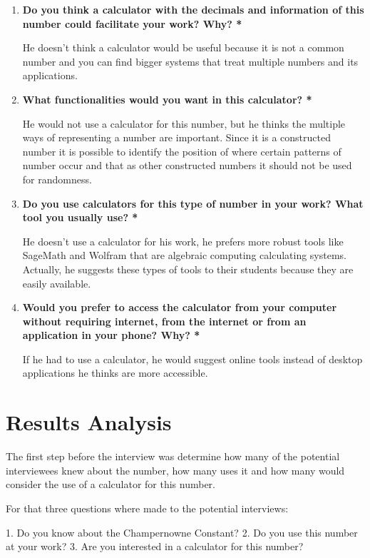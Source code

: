 \documentclass{article}
\begin{document}
\begin{enumerate}
\item\textbf{Do you think a calculator with the decimals and information of this number could facilitate your work? Why?\color{red} *}

He doesn’t think a calculator would be useful because it is not a common number and you can find bigger systems that treat multiple numbers and its applications. 

\item\textbf{What functionalities would you want in this calculator?\color{red} *}

He would not use a calculator for this number, but he thinks the multiple ways of representing a number are important. Since it is a constructed number it is possible to identify the position of where certain patterns of number occur and that as other constructed numbers it should not be used for randomness.

\item\textbf{Do you use calculators for this type of number in your work? What tool you usually use?\color{red} *}

He doesn't use a calculator for his work, he prefers more robust tools like SageMath and Wolfram that are algebraic computing calculating systems. Actually, he suggests these types of tools to their students because they are easily available.

\item\textbf{Would you prefer to access the calculator from your computer without requiring internet, from the internet or from an application in your phone? Why?\color{red} *}

If he had to use a calculator, he would suggest online tools instead of desktop applications he thinks are more accessible.

\end{enumerate}

\section*{Results Analysis} %

The first step before the interview was determine how many of the potential interviewees knew about the number, how many uses it and how many would consider the use of a calculator for this number.

For that three questions where made to the potential interviews:

1. Do you know about the Champernowne Constant?
2. Do you use this number at your work?
3. Are you interested in a calculator for this number?
\end{document}
